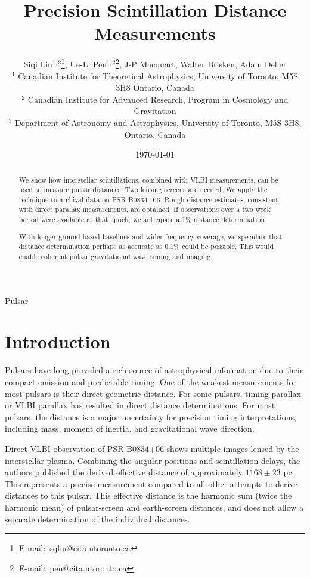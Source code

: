 \documentclass[useAMS,usenatbib]{mn2e}
\title[Lensing Distance]{
Precision Scintillation Distance Measurements
}
\author[Liu et al]{Siqi Liu$^{1,3}$\thanks{E-mail:\ sqliu@cita.utoronto.ca}, Ue-Li
  Pen$^{1,2}$\thanks{E-mail:\ pen@cita.utoronto.ca}, J-P Macquart,
  Walter Brisken, Adam Deller\\
 $^1$ Canadian Institute for Theoretical Astrophysics, University of Toronto, M5S 3H8 Ontario, Canada \\
$^2$ Canadian Institute for Advanced Research, Program in Cosmology
and Gravitation\\
$^3$ Department of Astronomy and Astrophysics, University of Toronto, M5S 3H8, Ontario, Canada
}
\begin{document}
\date{\today}

\pagerange{\pageref{firstpage}--\pageref{lastpage}} 

\maketitle
\label{firstpage}
\begin{abstract}
We show how interstellar scintillations, combined with VLBI
measurements, can be used to measure pulsar distances.  Two lensing
screens are needed.  We apply the technique to archival data on PSR
B0834+06.  Rough distance estimates, consistent with direct parallax
measurements, are obtained.  If observations over a two week period
were available at that epoch, we anticipate a 1\% distance
determination.   

With longer ground-based baselines and wider frequency coverage, we
speculate that distance determination perhaps as accurate as 0.1\%
could be possible. This would enable coherent pulsar gravitational
wave timing and imaging.
\end{abstract}
\begin{keywords}
Pulsar
\end{keywords}

\newcommand{\be}{\begin{eqnarray}}
\newcommand{\ee}{\end{eqnarray}}
\newcommand{\beq}{\begin{equation}}
\newcommand{\eeq}{\end{equation}}

\section{Introduction}

Pulsars have long provided a rich source of astrophysical information
due to their compact emission and predictable timing.   One of the
weakest measurements for most pulsars is their direct geometric
distance.  For some pulsars, timing parallax or VLBI parallax has
resulted in direct distance determinations.  For most pulsars, the
distance is a major uncertainty for precision timing interpretations,
including mass, moment of inertia, and gravitational wave
direction\citep{boyle2012}.

Direct VLBI observation of PSR B0834+06 shows multiple images lensed
by the interstellar plasma.  Combining the angular positions and
scintillation delays, the authors published the derived effective
distance\citep{2010ApJ...708..232B} of approximately $1168\pm 23$ pc.
This represents a precise measurement compared to all other attempts
to derive distances to this pulsar.  This effective distance is the
harmonic sum (twice the harmonic mean) of pulsar-screen and
earth-screen distances, and does not allow a separate determination of
the individual distances.
\end{document}
